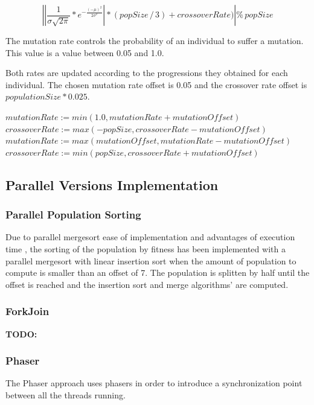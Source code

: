 \documentclass[runningheads]{llncs}
\begin{document}
\[ \left |\left | \frac{1}{\sigma \sqrt{2\pi}}*e^{-\frac{(-\mu)^2}{2\sigma^2}} \right | * (popSize\,/\,3) + crossoverRate)  \right | \%  \, popSize \]	

The mutation rate controls the probability of an individual to suffer a mutation. This value is a value between 0.05 and 1.0.

Both rates are updated according to the progressions they obtained for each individual. The chosen mutation rate offset is 0.05 and the crossover rate offset is \(populationSize * 0.025\).

\begin{algorithmic}
        \State $mutationRate := min(1.0, mutationRate + mutationOffset)$
        \State $crossoverRate := max(-popSize, crossoverRate - mutationOffset)$
\EndIf
{}
        \State $mutationRate := max(mutationOffset, mutationRate - mutationOffset)$
        \State $crossoverRate := min(popSize, crossoverRate + mutationOffset)$
\EndIf
\end{algorithmic}

\subsection{Parallel Versions Implementation}
\subsubsection{Parallel Population Sorting} \label{subsubsec:parallelSort} \hfill \par
Due to parallel mergesort ease of implementation and advantages of execution time \cite{analysisMergeSort}, the sorting of the population by fitness has been implemented with a parallel mergesort with linear insertion sort when the amount of population to compute is smaller than an offset of 7. The population is splitten by half until the offset is reached and the insertion sort and merge algorithms' are computed.


\subsubsection{ForkJoin} \hfill \par
\textbf{TODO:}

\subsubsection{Phaser} \hfill \par
The Phaser approach uses phasers in order to introduce a synchronization point between all the threads running.
\end{document}
